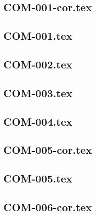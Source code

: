 \renewcommand{\xxexo}{COM-001-cor.tex} 
\subsection*{\xxexo} 
\graphicspath{{../../exoscomplexite/equadiffs/\xxexo/}}
 
 
\renewcommand{\xxexo}{COM-001.tex} 
\subsection*{\xxexo} 
\graphicspath{{../../exoscomplexite/equadiffs/\xxexo/}}
 
 
\renewcommand{\xxexo}{COM-002.tex} 
\subsection*{\xxexo} 
\graphicspath{{../../exoscomplexite/equadiffs/\xxexo/}}
 
 
\renewcommand{\xxexo}{COM-003.tex} 
\subsection*{\xxexo} 
\graphicspath{{../../exoscomplexite/equadiffs/\xxexo/}}
 
 
\renewcommand{\xxexo}{COM-004.tex} 
\subsection*{\xxexo} 
\graphicspath{{../../exoscomplexite/equadiffs/\xxexo/}}
 
 
\renewcommand{\xxexo}{COM-005-cor.tex} 
\subsection*{\xxexo} 
\graphicspath{{../../exoscomplexite/equadiffs/\xxexo/}}
 
 
\renewcommand{\xxexo}{COM-005.tex} 
\subsection*{\xxexo} 
\graphicspath{{../../exoscomplexite/equadiffs/\xxexo/}}
 
 
\renewcommand{\xxexo}{COM-006-cor.tex} 
\subsection*{\xxexo} 
\graphicspath{{../../exoscomplexite/equadiffs/\xxexo/}}
 
 
